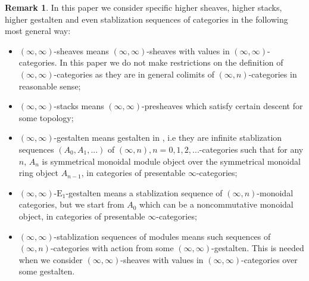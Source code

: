 \documentclass[12pt]{article}
\theoremstyle{definition}
\newtheorem{remark}{Remark}
\begin{document}
\begin{remark}
In this paper we consider specific higher sheaves, higher stacks, higher gestalten and even stablization sequences of categories in the following most general way:
\begin{itemize}\setlength{\itemsep}{-0.1cm}
\item[1] $(\infty,\infty)$-sheaves means $(\infty,\infty)$-sheaves with values in $(\infty,\infty)$-categories. In this paper we do not make restrictions on the definition of $(\infty,\infty)$-categories as they are in general colimits of $(\infty,n)$-categories in reasonable sense;
\item[2] $(\infty,\infty)$-stacks means $(\infty,\infty)$-presheaves which satisfy certain descent for some topology;
\item[3] $(\infty,\infty)$-gestalten means gestalten in \cite{5S5}, i.e they are infinite stablization sequences $(A_0,A_1,...)$ of $(\infty,n),n=0,1,2,...$-categories such that for any $n$, $A_n$ is symmetrical monoidal module object over the symmetrical monoidal ring object $A_{n-1}$, in categories of presentable $\infty$-categories;
\item[4] $(\infty,\infty)$-$\mathrm{E}_1$-gestalten means a stablization sequence of $(\infty,n)$-monoidal categories, but we start from $A_0$ which can be a noncommutative monoidal object, in categories of presentable $\infty$-categories;
\item[5] $(\infty,\infty)$-stablization sequences of modules means such sequences of $(\infty,n)$-categories with action from some $(\infty,\infty)$-gestalten. This is needed when we consider $(\infty,\infty)$-sheaves with values in $(\infty,\infty)$-categories over some gestalten.
\end{itemize}

\end{remark}
\end{document}
